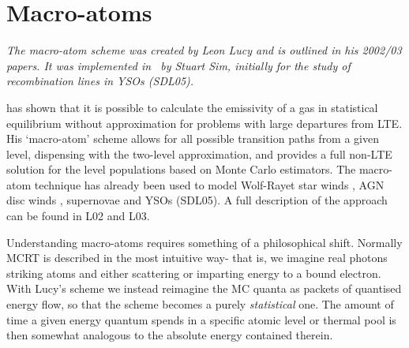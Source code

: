 
\section{Macro-atoms}
\label{sec:matoms}
{\sl The macro-atom scheme was created by Leon Lucy and is outlined in 
his 2002/03 papers. It was implemented in \py\ by Stuart Sim, initially
for the study of recombination lines in YSOs (SDL05).
}

\citet[][hereafter L02, L03]{lucy2002, lucy2003}
has shown that it is possible to calculate the emissivity of a gas in
statistical equilibrium without approximation for problems with large departures
from LTE.
His `macro-atom' scheme allows for all possible transition paths from a given level,
dispensing with the two-level approximation, and
provides a full non-LTE solution
for the level populations based on Monte Carlo estimators. The macro-atom
technique has already been used to model Wolf-Rayet star
winds \citep{sim2004}, AGN disc winds \citep{simlong2008, tatum2012},
supernovae \citep{kromersim2009, kerzendorfsim} and YSOs (SDL05). A full 
description of the approach can be found in L02 and L03.

Understanding macro-atoms requires something of a philosophical shift.
Normally MCRT is described in the most intuitive way- that is, we imagine
real photons striking atoms and either scattering or imparting energy to a 
bound electron. With Lucy's scheme we instead 
reimagine the MC quanta as packets of quantised energy flow, 
so that the scheme becomes a purely
{\em statistical} one. The amount of time a given energy quantum spends in a specific atomic
level or thermal pool is then somewhat analogous to the absolute energy 
contained therein.

